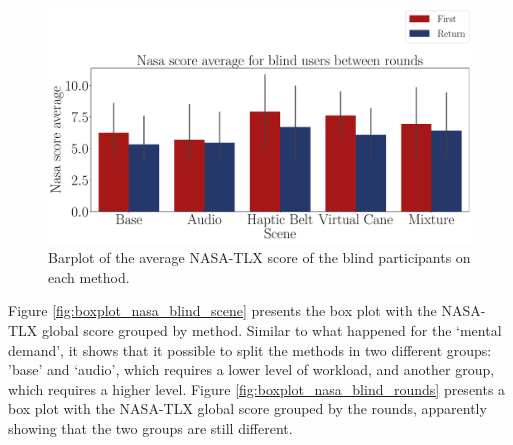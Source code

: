 \begin{figure}[!htb]
    \centering
    \includegraphics[width = \textwidth]{Resultados/Nasa/Figuras/pdf/barplot_nasa_avg_5_scene_blind.pdf}
    \caption{Barplot of the average NASA-TLX score of the blind participants on each method.}
    \label{fig:barplot_nasa_avg_5_scene_blind}
\end{figure}

Figure \ref{fig:boxplot_nasa_blind_scene} presents the box plot with the NASA-TLX global score grouped by method. Similar to what happened for the ‘mental demand’, it shows that it possible to split the methods in two different groups: ’base’ and ‘audio’, which requires a lower level of workload, and another group, which requires a higher level. Figure \ref{fig:boxplot_nasa_blind_rounds} presents a box plot with the NASA-TLX global score grouped by the rounds, apparently showing that the two groups are still different. 

